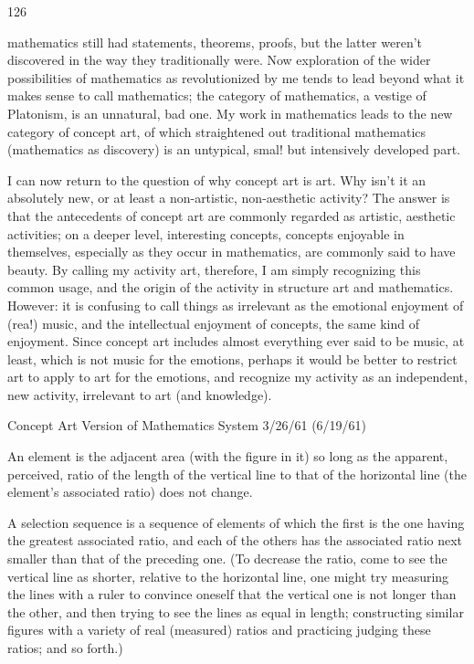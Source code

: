 \documentclass[10pt,twoside]{memoir}
\begin{document}
\begin{enumerate}
{{{{{{{{{{{{{{{{126 


mathematics still had statements, theorems, proofs, but the latter weren't 
discovered in the way they traditionally were. Now exploration of the wider 
possibilities of mathematics as revolutionized by me tends to lead beyond 
what it makes sense to call mathematics; the category of mathematics, a 
vestige of Platonism, is an unnatural, bad one. My work in mathematics leads 
to the new category of concept art, of which straightened out traditional 
mathematics (mathematics as discovery) is an untypical, smal! but 
intensively developed part. 

I can now return to the question of why concept art is art. Why isn't it an 
absolutely new, or at least a non-artistic, non-aesthetic activity? The answer 
is that the antecedents of concept art are commonly regarded as artistic, 
aesthetic activities; on a deeper level, interesting concepts, concepts 
enjoyable in themselves, especially as they occur in mathematics, are 
commonly said to have beauty. By calling my activity art, therefore, I am 
simply recognizing this common usage, and the origin of the activity in 
structure art and mathematics. However: it is confusing to call things as 
irrelevant as the emotional enjoyment of (rea!) music, and the intellectual 
enjoyment of concepts, the same kind of enjoyment. Since concept art 
includes almost everything ever said to be music, at least, which is not music 
for the emotions, perhaps it would be better to restrict art to apply to art for 
the emotions, and recognize my activity as an independent, new activity, 
irrelevant to art (and knowledge). 


Concept Art Version of Mathematics System 3/26/61 (6/19/61) 

An element is the adjacent area (with the figure in it) so long as the 
apparent, perceived, ratio of the length of the vertical line to that of the 
horizontal line (the element's associated ratio) does not change. 

A selection sequence is a sequence of elements of which the first is the one 
having the greatest associated ratio, and each of the others has the associated 
ratio next smaller than that of the preceding one. (To decrease the ratio, 
come to see the vertical line as shorter, relative to the horizontal line, one 
might try measuring the lines with a ruler to convince oneself that the 
vertical one is not longer than the other, and then trying to see the lines as 
equal in length; constructing similar figures with a variety of real (measured) 
ratios and practicing judging these ratios; and so forth.) 

}}}}}}}}}}}}}}}}
\end{enumerate}
\end{document}
